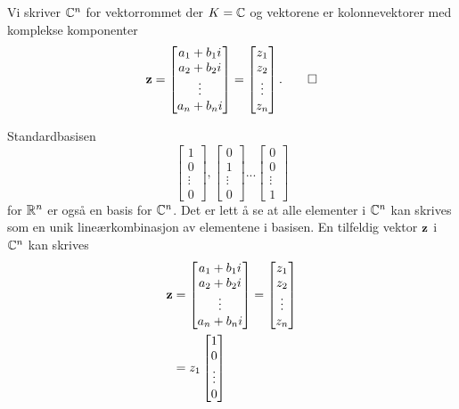 \begin{defn}
Vi skriver $\mathbb{C}^n$ for vektorrommet der $K=\mathbb{C}$ og vektorene er kolonnevektorer med komplekse komponenter 
\[
\mathbf{z}=
\begin{bmatrix}
a_1+b_1 i    \\ a_2+b_2 i   \\ \vdots \\ a_n+b_n i 
\end{bmatrix}
=
\begin{bmatrix}
z_1    \\ z_2   \\ \vdots \\ z_n
\end{bmatrix}.\qedhere
\]
\end{defn}

\begin{ex}
Standardbasisen 
\[
\begin{bmatrix}
1    \\ 0  \\ \vdots \\ 0
\end{bmatrix},
\begin{bmatrix}
0    \\ 1  \\ \vdots \\ 0
\end{bmatrix}
...
\begin{bmatrix}
0    \\ 0  \\ \vdots \\ 1
\end{bmatrix}
\]
for $\mathbb{R}^n$ er også en basis for $\mathbb{C}^n$. 
Det er lett å se at alle elementer i $\mathbb{C}^n$ kan skrives som en unik lineærkombinasjon av elementene i basisen. 
En tilfeldig vektor $\mathbf{z}$ i $\mathbb{C}^n$ kan skrives
\begin{align*}
\mathbf{z}&=
\begin{bmatrix}
a_1+b_1 i    \\ a_2+b_2 i   \\ \vdots \\ a_n+b_n i 
\end{bmatrix}
=
\begin{bmatrix}
z_1    \\ z_2   \\ \vdots \\ z_n
\end{bmatrix}
\\&=
z_1
\begin{bmatrix}
1    \\ 0  \\ \vdots \\ 0

\end{bmatrix}
\end{align*}
\end{ex}
